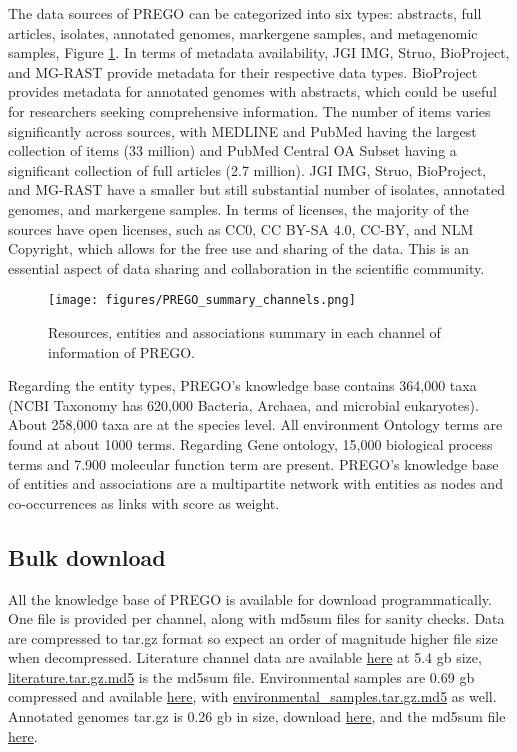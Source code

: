 The data sources of PREGO can be categorized into six types: abstracts, full articles,
isolates, annotated genomes, markergene samples, and metagenomic samples, Figure \ref{fig:prego-summary}.
In terms of metadata availability, JGI IMG, Struo, BioProject, and MG-RAST provide
metadata for their respective data types.
BioProject provides metadata for annotated genomes with abstracts, which could be useful for researchers seeking comprehensive information.
The number of items varies significantly across sources, with MEDLINE and PubMed
having the largest collection of items (33 million) and PubMed Central OA Subset
having a significant collection of full articles (2.7 million).
JGI IMG, Struo, BioProject, and MG-RAST have a smaller but still substantial number of isolates, annotated genomes, and markergene samples.
In terms of licenses, the majority of the sources have open licenses,
such as CC0, CC BY-SA 4.0, CC-BY, and NLM Copyright, which allows for the free
use and sharing of the data. This is an essential aspect of data sharing and
collaboration in the scientific community.

   \begin{figure}[hbt!]
      \centering
      \texttt{[image: figures/PREGO\_summary\_channels.png]}
      \caption[PREGO contents summary]{
         Resources, entities and associations summary in each channel of information of PREGO.}
      \label{fig:prego-summary}
   \end{figure}

Regarding the entity types, PREGO's knowledge base contains 364,000 taxa
(NCBI Taxonomy has 620,000 Bacteria, Archaea, and microbial eukaryotes). 
About 258,000 taxa are at the species level. 
All environment Ontology terms are found at about 1000 terms. Regarding Gene ontology, 15,000 biological process terms and 7.900 molecular function term are present.
PREGO's knowledge base of entities and associations are a multipartite network
with entities as nodes and co-occurrences as links with score as weight.

\subsection{Bulk download}
\label{bulk-download}

All the knowledge base of PREGO is available for download programmatically.
One file is provided per channel, along with md5sum files for sanity checks.
Data are compressed to tar.gz format so expect an order of magnitude higher file size when decompressed.
Literature channel data are available \href{https://prego.hcmr.gr/download/literature.tar.gz}{here}
at 5.4 gb size, \href{https://prego.hcmr.gr/download/literature.tar.gz.md5}{literature.tar.gz.md5} is the md5sum file.
Environmental samples are 0.69 gb compressed and available \href{https://prego.hcmr.gr/download/environmental\_samples.tar.gz}{here},
with \href{https://prego.hcmr.gr/download/environmental\_samples.tar.gz.md5}{environmental\_samples.tar.gz.md5} as well.
Annotated genomes tar.gz is 0.26 gb in size, download \href{https://prego.hcmr.gr/download/annotated\_genomes\_isolates.tar.gz}{here}, and 
the md5sum file \href{https://prego.hcmr.gr/download/annotated\_genomes\_isolates.tar.gz.md5}{here}.

